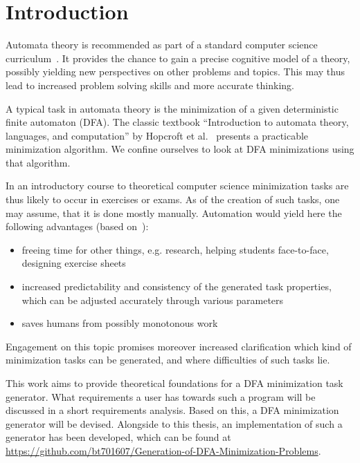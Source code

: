 
\chapter{Introduction} \label{ch:1}


Automata theory is recommended as part of a standard computer science curriculum~\cite[pp. 5-6]{GI16}. It provides the chance to gain a precise cognitive model of a theory, possibly yielding new perspectives on other problems and topics. This may thus lead to increased problem solving skills and more accurate thinking.


A typical task in automata theory is the minimization of a given deterministic finite automaton (DFA). The classic textbook ``Introduction to automata theory, languages, and computation'' by Hopcroft et al.~\cite{HMU01} presents a practicable minimization algorithm. We confine ourselves to look at DFA minimizations using that algorithm.


In an introductory course to theoretical computer science minimization tasks are thus likely to occur in exercises or exams. As of the creation of such tasks, one may assume, that it is done mostly manually. Automation would yield here the following advantages (based on~\cite[pp. 1-4]{Lam13}):
\begin{itemize}
	\item freeing time for other things, e.g. research, helping students face-to-face, designing exercise sheets
	
	\item increased predictability and consistency of the generated task properties, which can be adjusted accurately through various parameters
	
	\item saves humans from possibly monotonous work
\end{itemize}
Engagement on this topic promises moreover increased clarification which kind of minimization tasks can be generated, and where difficulties of such tasks lie.

This work aims to provide theoretical foundations for a DFA minimization task generator. What requirements a user has towards such a program will be discussed in a short requirements analysis. Based on this, a DFA minimization generator will be devised. Alongside to this thesis, an implementation of such a generator has been developed, which can be found at \url{https://github.com/bt701607/Generation-of-DFA-Minimization-Problems}.
